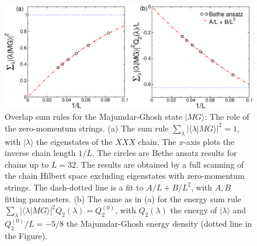 \documentclass[11pt]{iopart}
\begin{document}
\begin{figure}[t]
\begin{center}
\includegraphics[width=.9\textwidth]{Dimer}
\end{center}
\caption{Overlap sum rules for the Majumdar-Ghosh state $|MG\rangle$: 
 The role of the zero-momentum strings. (a) The sum rule $\sum_{\lambda}|
 \langle\lambda|MG\rangle|^2=1$, with $|\lambda\rangle$ the eigenstates   
 of the $XXX$ chain. The $x$-axis plots the inverse chain length $1/L$. 
 The circles are Bethe ansatz results for chains up to $L=32$. The results 
 are obtained by a full scanning of the chain Hilbert space excluding eigenstates with zero-momentum strings. 
 The dash-dotted line is a fit to $A/L+B/L^2$, with $A,B$ fitting parameters. 
 (b) The same as in (a) for the energy sum rule $\sum_{\lambda}|\langle\lambda|MG\rangle
 |^2Q_2(\lambda)=Q_2^{(0)}$, with $Q_2(\lambda)$  the energy of $|\lambda
 \rangle$ and $Q_2^{(0)}/L=-5/8$ the Majumdar-Ghosh energy density (dotted 
 line in the Figure). 
}
\label{fig2:dimer-sr}
\end{figure}
\end{document}
